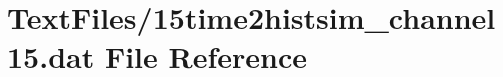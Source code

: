 \hypertarget{15time2histsim__channel15_8dat}{}\section{Text\+Files/15time2histsim\+\_\+channel15.dat File Reference}
\label{15time2histsim__channel15_8dat}
